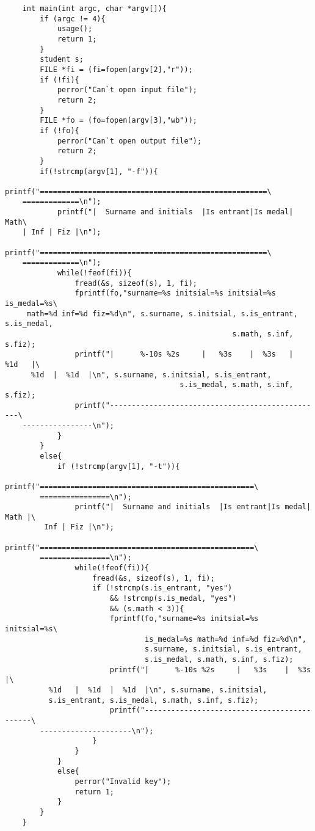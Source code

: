 \begin{spacing}{1}
\begin{verbatim}
    int main(int argc, char *argv[]){
        if (argc != 4){
            usage();
            return 1;
        }
        student s;
        FILE *fi = (fi=fopen(argv[2],"r"));
        if (!fi){
            perror("Can`t open input file");
            return 2;
        }
        FILE *fo = (fo=fopen(argv[3],"wb"));
        if (!fo){
            perror("Can`t open output file");
            return 2;
        }
        if(!strcmp(argv[1], "-f")){
            printf("====================================================\
    =============\n");
            printf("|  Surname and initials  |Is entrant|Is medal| Math\ 
    | Inf | Fiz |\n");
            printf("====================================================\
    =============\n");  
            while(!feof(fi)){
                fread(&s, sizeof(s), 1, fi);
                fprintf(fo,"surname=%s initsial=%s initsial=%s is_medal=%s\
     math=%d inf=%d fiz=%d\n", s.surname, s.initsial, s.is_entrant, s.is_medal, 
                                                    s.math, s.inf, s.fiz);
                printf("|      %-10s %2s     |   %3s    |  %3s   |  %1d   |\
      %1d  |  %1d  |\n", s.surname, s.initsial, s.is_entrant, 
                                        s.is_medal, s.math, s.inf, s.fiz);
                printf("-------------------------------------------------\
    ----------------\n");
            }
        }
        else{
            if (!strcmp(argv[1], "-t")){
                printf("=================================================\
        ================\n");
                printf("|  Surname and initials  |Is entrant|Is medal| Math |\
         Inf | Fiz |\n");
                printf("=================================================\
        ================\n");
                while(!feof(fi)){
                    fread(&s, sizeof(s), 1, fi);
                    if (!strcmp(s.is_entrant, "yes") 
                        && !strcmp(s.is_medal, "yes") 
                        && (s.math < 3)){
                        fprintf(fo,"surname=%s initsial=%s initsial=%s\ 
                                is_medal=%s math=%d inf=%d fiz=%d\n", 
                                s.surname, s.initsial, s.is_entrant, 
                                s.is_medal, s.math, s.inf, s.fiz);
                        printf("|      %-10s %2s     |   %3s    |  %3s   |\
          %1d   |  %1d  |  %1d  |\n", s.surname, s.initsial, 
          s.is_entrant, s.is_medal, s.math, s.inf, s.fiz);
                        printf("--------------------------------------------\
        ---------------------\n");
                    }
                }
            }
            else{
                perror("Invalid key");
                return 1;
            }
        }
    }
    \end{verbatim} 
    
    
\end{spacing}